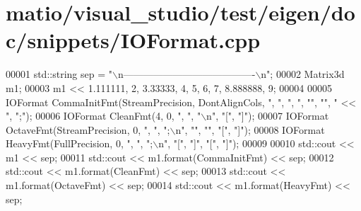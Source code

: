 \hypertarget{matio_2visual__studio_2test_2eigen_2doc_2snippets_2_i_o_format_8cpp_source}{}\section{matio/visual\+\_\+studio/test/eigen/doc/snippets/\+I\+O\+Format.cpp}
\label{matio_2visual__studio_2test_2eigen_2doc_2snippets_2_i_o_format_8cpp_source}

\begin{DoxyCode}
00001 std::string sep = \textcolor{stringliteral}{"\(\backslash\)n----------------------------------------\(\backslash\)n"};
00002 Matrix3d m1;
00003 m1 << 1.111111, 2, 3.33333, 4, 5, 6, 7, 8.888888, 9;
00004 
00005 IOFormat CommaInitFmt(StreamPrecision, DontAlignCols, \textcolor{stringliteral}{", "}, \textcolor{stringliteral}{", "}, \textcolor{stringliteral}{""}, \textcolor{stringliteral}{""}, \textcolor{stringliteral}{" << "}, \textcolor{stringliteral}{";"});
00006 IOFormat CleanFmt(4, 0, \textcolor{stringliteral}{", "}, \textcolor{stringliteral}{"\(\backslash\)n"}, \textcolor{stringliteral}{"["}, \textcolor{stringliteral}{"]"});
00007 IOFormat OctaveFmt(StreamPrecision, 0, \textcolor{stringliteral}{", "}, \textcolor{stringliteral}{";\(\backslash\)n"}, \textcolor{stringliteral}{""}, \textcolor{stringliteral}{""}, \textcolor{stringliteral}{"["}, \textcolor{stringliteral}{"]"});
00008 IOFormat HeavyFmt(FullPrecision, 0, \textcolor{stringliteral}{", "}, \textcolor{stringliteral}{";\(\backslash\)n"}, \textcolor{stringliteral}{"["}, \textcolor{stringliteral}{"]"}, \textcolor{stringliteral}{"["}, \textcolor{stringliteral}{"]"});
00009 
00010 std::cout << m1 << sep;
00011 std::cout << m1.format(CommaInitFmt) << sep;
00012 std::cout << m1.format(CleanFmt) << sep;
00013 std::cout << m1.format(OctaveFmt) << sep;
00014 std::cout << m1.format(HeavyFmt) << sep;
\end{DoxyCode}
